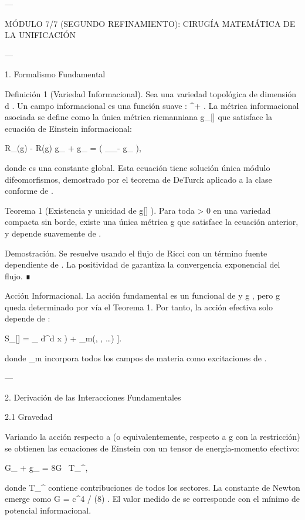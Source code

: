 \documentclass[12pt,twoside]{book}
\begin{document}
---

MÓDULO 7/7 (SEGUNDO REFINAMIENTO): CIRUGÍA MATEMÁTICA DE LA UNIFICACIÓN

---

1. Formalismo Fundamental

Definición 1 (Variedad Informacional). Sea    una variedad topológica de dimensión  d . Un campo informacional es una función suave  \rho :  \to {}^+ . La métrica informacional asociada se define como la única métrica riemanniana  g_{\mu\nu}[\rho]  que satisface la ecuación de Einstein informacional:

R_{\mu\nu}(g) -  R(g) g_{\mu\nu} + \Lambda g_{\mu\nu} =  \left( \nabla_\mu \nabla_\nu \rho - g_{\mu\nu} \Box \rho \right),

donde  \Lambda  es una constante global. Esta ecuación tiene solución única módulo difeomorfismos, demostrado por el teorema de DeTurck aplicado a la clase conforme de  \rho .

Teorema 1 (Existencia y unicidad de  g[\rho] ). Para toda  \rho > 0  en una variedad compacta sin borde, existe una única métrica  g  que satisface la ecuación anterior, y depende suavemente de  \rho .

Demostración. Se resuelve usando el flujo de Ricci con un término fuente dependiente de  \rho . La positividad de  \rho  garantiza la convergencia exponencial del flujo. ∎

Acción Informacional. La acción fundamental es un funcional de  \rho  y  g , pero  g  queda determinado por  \rho  vía el Teorema 1. Por tanto, la acción efectiva solo depende de  \rho :

S_{}[\rho] = \int_ d^d x  \left[ \frac{1}{2\kappa} R(g[\rho]) + _m(\rho, \nabla\rho, \dots) \right].

donde  _m  incorpora todos los campos de materia como excitaciones de  \rho .

---

2. Derivación de las Interacciones Fundamentales

2.1 Gravedad

Variando la acción respecto a  \rho  (o equivalentemente, respecto a  g  con la restricción) se obtienen las ecuaciones de Einstein con un tensor de energía-momento efectivo:

G_{\mu\nu} + \Lambda g_{\mu\nu} = 8\pi G \, T_{\mu\nu}^{},

donde  T_{\mu\nu}^{}  contiene contribuciones de todos los sectores. La constante de Newton emerge como  G = \kappa c^4 / (8\pi \hbar) . El valor medido de  \Lambda  se corresponde con el mínimo de potencial informacional.
\end{document}
